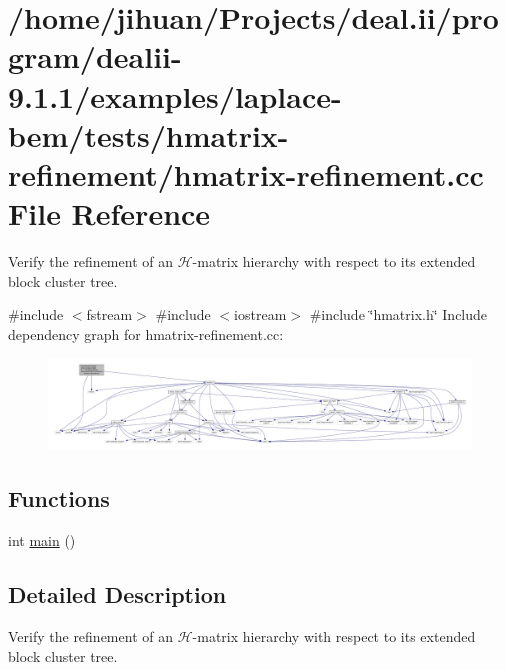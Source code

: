\hypertarget{hmatrix-refinement_8cc}{}\section{/home/jihuan/\+Projects/deal.ii/program/dealii-\/9.1.1/examples/laplace-\/bem/tests/hmatrix-\/refinement/hmatrix-\/refinement.cc File Reference}
\label{hmatrix-refinement_8cc}


Verify the refinement of an $\mathcal{H}$-\/matrix hierarchy with respect to its extended block cluster tree.  


{\ttfamily \#include $<$fstream$>$}\newline
{\ttfamily \#include $<$iostream$>$}\newline
{\ttfamily \#include \char`\"{}hmatrix.\+h\char`\"{}}\newline
Include dependency graph for hmatrix-\/refinement.cc\+:\nopagebreak
\begin{figure}[H]
\begin{center}
\leavevmode
\includegraphics[width=350pt]{hmatrix-refinement_8cc__incl}
\end{center}
\end{figure}
\subsection*{Functions}
\begin{DoxyCompactItemize}
\item 
int \hyperlink{hmatrix-refinement_8cc_ae66f6b31b5ad750f1fe042a706a4e3d4}{main} ()
\end{DoxyCompactItemize}


\subsection{Detailed Description}
Verify the refinement of an $\mathcal{H}$-\/matrix hierarchy with respect to its extended block cluster tree. 

